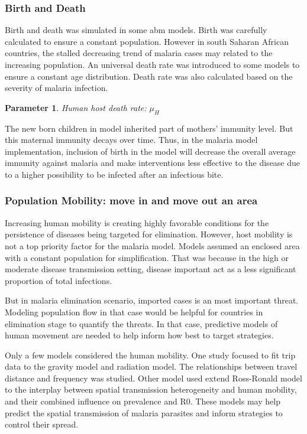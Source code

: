 \documentclass[a4paper, 12pt, twoside]{article}
\newtheorem{parameter}{Parameter}
\begin{document}
\subsubsection{Birth and Death}
Birth and death was simulated in some \gls{abm} models.
Birth was carefully calculated to ensure a constant population.
However in south Saharan African countries, the stalled decreasing trend of malaria cases may related to the increasing population.
An universal death rate was introduced to some models  to ensure a constant age distribution.
Death rate was also calculated based on the severity of malaria infection.
\begin{parameter}
	{Human host death rate:}
	{$\mu_H$}
\end{parameter}
The new born children in model inherited part of mothers' immunity level.
But this maternal immunity decays over time.
Thus, in the malaria model implementation, inclusion of birth in the model will decrease the overall average immunity against malaria and make interventions less effective to the disease due to a higher possibility to be infected after an infectious bite.

\subsubsection{Population Mobility: move in and move out an area}
Increasing human mobility is creating highly favorable conditions for the persistence of diseases being targeted for elimination.
However, host mobility is not a top priority factor for the malaria model.
Models assumed an enclosed area with a constant population for simplification.
That was because in the high or moderate disease transmission setting, disease important act as a less significant proportion of total infections.

But in malaria elimination scenario, imported cases is an most important threat.
Modeling population flow in that case would be helpful for countries in elimination stage to quantify the threats.
In that case, predictive models of human movement are needed to help inform how best to target strategies.

Only a few models\cite{Zhu2015a} considered the human mobility.
One study focused to fit trip data to the gravity model and radiation model\cite{Marshall2018}.
The relationships between travel distance and frequency was studied.
Other model\cite{acevedo_spatial_2015} used extend Ross-Ronald model to the interplay between spatial transmission heterogeneity and human mobility, and their combined influence on prevalence and \gls{R0}.
These models may help predict the spatial transmission of malaria parasites and inform strategies to control their spread.
\end{document}
